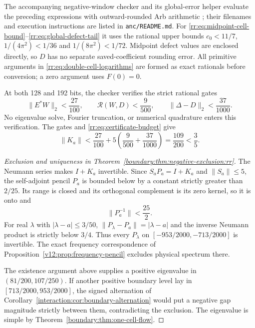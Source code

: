 The accompanying negative-window checker and its global-error helper
evaluate the preceding expressions with outward-rounded Arb arithmetic
\cite{Johansson2017}; their filenames and execution instructions are
listed in \texttt{anc/README.md}.
For \eqref{rr:eq:midpoint-cell-bound}--\eqref{rr:eq:global-defect-tail}
it uses the rational upper bounds $c_0<11/7$,
$1/(4\pi^2)<1/36$ and $1/(8\pi^2)<1/72$.
Midpoint defect values are enclosed directly, so $D$ has no separate
saved-coefficient rounding error.  All primitive arguments in
\eqref{rr:eq:double-cell-logarithms} are formed as exact rationals
before conversion; a zero argument uses $F(0)=0$.

At both 128 and 192 bits, the checker verifies the strict rational gates
\begin{equation}\label{rr:eq:rational-certificate-gates}
 \|E^*W\|_2<\frac{27}{100},\qquad
 \mathcal R(W,D)<\frac9{500},\qquad
 \|\Delta-D\|_2<\frac{37}{1000}.
\end{equation}
No eigenvalue solve, Fourier truncation, or numerical quadrature enters
this verification.  The gates and \eqref{rr:eq:certificate-budget} give
\[
 \|K_a\|<\frac{27}{100}
          +5\left(\frac9{500}+\frac{37}{1000}\right)
       =\frac{109}{200}<\frac35.
\]

\begin{proof}[Exclusion and uniqueness in Theorem~\ref{boundary:thm:negative-exclusion:rr}]
The Neumann series makes $I+K_a$ invertible.  Since $S_aP_a=I+K_a$
and $\|S_a\|\le5$, the self-adjoint pencil $P_a$ is bounded below
by a constant strictly greater than $2/25$.  Its range is closed and
its orthogonal complement is its zero kernel, so it is onto and
\[
 \|P_a^{-1}\|<\frac{25}{2}.
\]
For real $\lambda$ with $|\lambda-a|\le3/50$,
$\|P_\lambda-P_a\|=|\lambda-a|$ and the inverse Neumann product is
strictly below $3/4$.  Thus every $P_\lambda$ on
$[-953/2000,-713/2000]$ is invertible.  The exact frequency
correspondence of Proposition~\ref{v12:prop:frequency-pencil} excludes
physical spectrum there.

The existence argument above supplies a
positive eigenvalue in $(81/200,107/250)$.  If another positive boundary
level lay in $[713/2000,953/2000]$, the signed alternation of
Corollary~\ref{interaction:cor:boundary-alternation} would put a negative
gap magnitude strictly between them, contradicting the exclusion.
The eigenvalue is simple by Theorem~\ref{boundary:thm:one-cell-flow}.
\end{proof}

